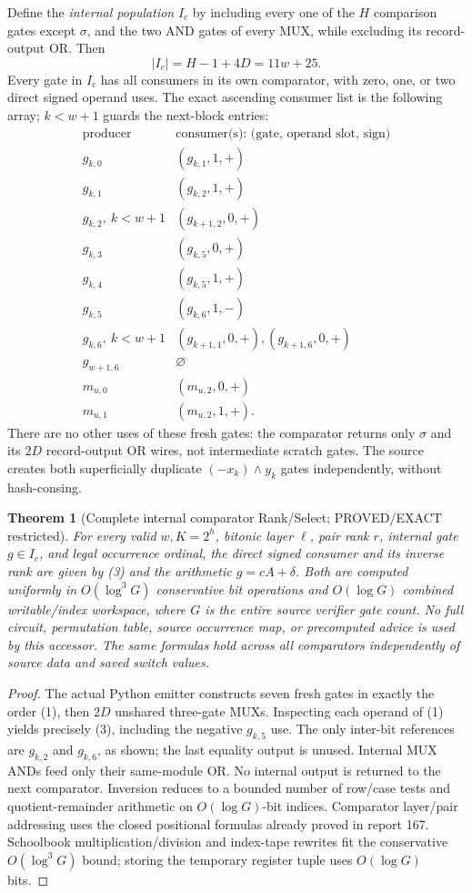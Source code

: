 \documentclass[11pt]{article}
\newtheorem{theorem}{Theorem}
\begin{document}
Define the \emph{internal population} $I_c$ by including every one of the $H$ comparison gates except $\sigma$, and the two AND gates of every MUX, while excluding its record-output OR. Then
\[
\boxed{|I_c|=H-1+4D=11w+25.}\tag{2}
\]
Every gate in $I_c$ has all consumers in its own comparator, with zero, one, or two direct signed operand uses. The exact ascending consumer list is the following array; $k<w+1$ guards the next-block entries:
\[
\begin{array}{c|l}
\text{producer} & \text{consumer(s): (gate, operand slot, sign)}\\\hline
g_{k,0}&(g_{k,1},1,+)\\
g_{k,1}&(g_{k,2},1,+)\\
g_{k,2},\ k<w+1&(g_{k+1,2},0,+)\\
g_{k,3}&(g_{k,5},0,+)\\
g_{k,4}&(g_{k,5},1,+)\\
g_{k,5}&(g_{k,6},1,-)\\
g_{k,6},\ k<w+1&(g_{k+1,1},0,+),(g_{k+1,6},0,+)\\
g_{w+1,6}&\varnothing\\
m_{u,0}&(m_{u,2},0,+)\\
m_{u,1}&(m_{u,2},1,+).
\end{array}\tag{3}
\]
There are no other uses of these fresh gates: the comparator returns only $\sigma$ and its $2D$ record-output OR wires, not intermediate scratch gates. The source creates both superficially duplicate $(-x_k)\land y_k$ gates independently, without hash-consing.

\begin{theorem}[Complete internal comparator Rank/Select; PROVED/EXACT restricted]
For every valid $w,K=2^h$, bitonic layer $\ell$, pair rank $r$, internal gate $g\in I_c$, and legal occurrence ordinal, the direct signed consumer and its inverse rank are given by (3) and the arithmetic $g=cA+\delta$. Both are computed uniformly in $O(\log^3G)$ conservative bit operations and $O(\log G)$ combined writable/index workspace, where $G$ is the \emph{entire} source verifier gate count. No full circuit, permutation table, source occurrence map, or precomputed advice is used by this accessor. The same formulas hold across all comparators independently of source data and saved switch values.
\end{theorem}
\begin{proof}
The actual Python emitter constructs seven fresh gates in exactly the order (1), then $2D$ unshared three-gate MUXs. Inspecting each operand of (1) yields precisely (3), including the negative $g_{k,5}$ use. The only inter-bit references are $g_{k,2}$ and $g_{k,6}$, as shown; the last equality output is unused. Internal MUX ANDs feed only their same-module OR. No internal output is returned to the next comparator. Inversion reduces to a bounded number of row/case tests and quotient-remainder arithmetic on $O(\log G)$-bit indices. Comparator layer/pair addressing uses the closed positional formulas already proved in report 167. Schoolbook multiplication/division and index-tape rewrites fit the conservative $O(\log^3 G)$ bound; storing the temporary register tuple uses $O(\log G)$ bits.\end{proof}
\end{document}
